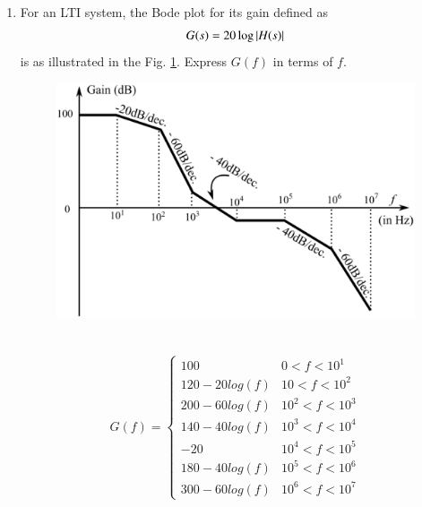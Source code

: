 \begin{enumerate}[label=\thesection.\arabic*.,ref=\thesection.\theenumi]

\item For an LTI system, the Bode plot for its gain defined as
\begin{align}
	G(s) = 20\log\left\vert H(s)\right\vert
	\label{eq:ee18btech11001_gain}
\end{align}
is as illustrated in the Fig. \ref{fig:ee18btech11001_bode}. Express $G(f)$ in terms of $f$.\\
\begin{figure}[ht!]
    \includegraphics[width=\columnwidth]{./figs/ee18btech11001.eps}
    \caption{}
    \label{fig:ee18btech11001_bode}
\end{figure}\\

\solution
\begin{align}
 G(f) = 
 \begin{cases} 
        100 & 0 < f < 10^{1} \\
      120-20log(f) & 10 < f < 10^{2} \\
      200-60log(f) & 10^2 < f < 10^{3} \\
      140-40log(f) & 10^{3} < f < 10^{4} \\
       -20 & 10^{4} < f < 10^{5} \\
      180-40log(f) & 10^{5} < f < 10^{6} \\
      300-60log(f) & 10^{6} < f < 10^{7}   
 \end{cases}
\end{align}



\end{enumerate}
